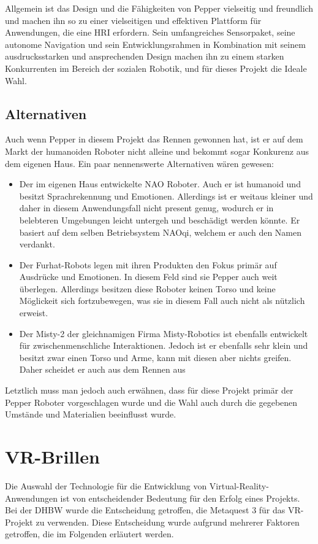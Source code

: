 Allgemein ist das Design und die Fähigkeiten von Pepper vielseitig und freundlich und machen ihn so zu einer vielseitigen und effektiven Plattform für Anwendungen, die eine \ac{HRI} erfordern. Sein umfangreiches Sensorpaket, seine autonome Navigation und sein Entwicklungsrahmen in Kombination mit seinem ausdrucksstarken und ansprechenden Design machen ihn zu einem starken Konkurrenten im Bereich der sozialen Robotik, und für dieses Projekt die Ideale Wahl.

\subsection{Alternativen}
Auch wenn Pepper in diesem Projekt das Rennen gewonnen hat, ist er auf dem Markt der humanoiden Roboter nicht alleine und bekommt sogar Konkurenz aus dem eigenen Haus. Ein paar nennenswerte Alternativen wären gewesen:
\begin{itemize}
    \item Der im eigenen Haus entwickelte NAO Roboter. Auch er ist humanoid und besitzt Sprachrekennung und Emotionen. Allerdings ist er weitaus kleiner und daher in diesem Anwendungsfall nicht present genug, wodurch er in belebteren Umgebungen leicht untergeh und beschädigt werden könnte. Er basiert auf dem selben Betriebsystem NAOqi, welchem er auch den Namen verdankt.
    \item Der Furhat-Robots legen mit ihren Produkten den Fokus primär auf Ausdrücke und Emotionen. In diesem Feld sind sie Pepper auch weit überlegen. Allerdings besitzen diese Roboter keinen Torso und keine Möglickeit sich fortzubewegen, was sie in diesem Fall auch nicht als nützlich erweist.
    \item Der Misty-2 der gleichnamigen Firma Misty-Robotics ist ebenfalls entwickelt für zwischenmenschliche Interaktionen. Jedoch ist er ebenfalls sehr klein und besitzt zwar einen Torso und Arme, kann mit diesen aber nichts greifen. Daher scheidet er auch aus dem Rennen aus
\end{itemize}
Letztlich muss man jedoch auch erwähnen, dass für diese Projekt primär der Pepper Roboter vorgeschlagen wurde und die Wahl auch durch die gegebenen Umstände und Materialien beeinflusst wurde.

\section{VR-Brillen}
Die Auswahl der Technologie für die Entwicklung von Virtual-Reality-Anwendungen ist von entscheidender Bedeutung für den Erfolg eines Projekts. Bei der DHBW wurde die Entscheidung getroffen, die Metaquest 3 für das VR-Projekt zu verwenden. Diese Entscheidung wurde aufgrund mehrerer Faktoren getroffen, die im Folgenden erläutert werden.
\\

